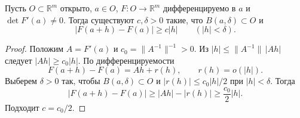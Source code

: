 \label{ticket:13}


\begin{lemma}
Пусть $O\subset\mathbb R^m$ открыто, $a\in O$, $F:O\to\mathbb R^m$ дифференцируемо в $a$ и $\det F'(a)\ne0$.
Тогда существуют $c,\delta>0$ такие, что $B(a,\delta)\subset O$ и
\[
  |F(a+h)-F(a)|\ge c|h|\qquad(|h|<\delta).
\]
\end{lemma}

\begin{proof}
Положим $A=F'(a)$ и $c_0=\|A^{-1}\|^{-1}>0$.
Из $|h|\le\|A^{-1}\|\,|Ah|$ следует $|Ah|\ge c_0|h|$.
По дифференцируемости
\[
  F(a+h)-F(a)=Ah+r(h),\qquad r(h)=o(|h|).
\]
Выберем $\delta>0$ так, чтобы $B(a,\delta)\subset O$ и $|r(h)|\le c_0|h|/2$ при $|h|<\delta$.
Тогда
\[
  |F(a+h)-F(a)|\ge|Ah|-|r(h)|\ge\frac{c_0}{2}|h|.
\]
Подходит $c=c_0/2$.
\end{proof}
